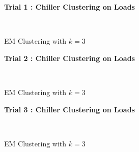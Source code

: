 \begin{figure}[!h]
\centerline{\bfseries\Large Trial 1 : Chiller Clustering on Loads}\\
\caption{EM Clustering with $k=3$}
\end{figure}
\begin{figure}[!h]
\centerline{\bfseries\Large Trial 2 : Chiller Clustering on Loads}\\
\caption{EM Clustering with $k=3$}
\end{figure}
\begin{figure}[!h]
\centerline{\bfseries\Large Trial 3 : Chiller Clustering on Loads}\\
\caption{EM Clustering with $k=3$}
\end{figure}
